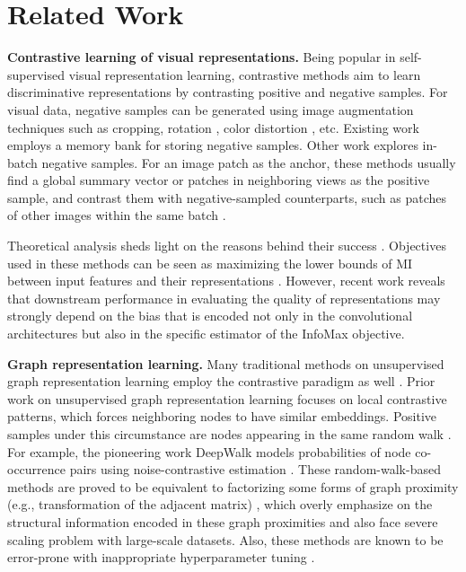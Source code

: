\documentclass{article}
\theoremstyle{remark}
\begin{document}
 \section{Related Work}

\textbf{Contrastive learning of visual representations.\quad}
Being popular in self-supervised visual representation learning, contrastive methods aim to learn discriminative representations by contrasting positive and negative samples. For visual data, negative samples can be generated using image augmentation techniques such as cropping, rotation \cite{Gidaris:2018wr}, color distortion \cite{Larsson:2017vt}, etc.
Existing work \cite{Wu:2018kw,Tian:2019vw,He:2020tu} employs a memory bank for storing negative samples. Other work \cite{Bachman:2019wp,Ye:2019we,Chen:2020wj} explores in-batch negative samples. For an image patch as the anchor, these methods usually find a global summary vector \cite{Hjelm:2019uk,Bachman:2019wp} or patches in neighboring views \cite{vandenOord:2018ut,Henaff:2019ta} as the positive sample, and contrast them with negative-sampled counterparts, such as patches of other images within the same batch \cite{Hjelm:2019uk}.

Theoretical analysis sheds light on the reasons behind their success \cite{Poole:2019vk}. Objectives used in these methods can be seen as maximizing the lower bounds of MI between input features and their representations \cite{Linsker:1988ho}. However, recent work \cite{Tschannen:2020uo} reveals that downstream performance in evaluating the quality of representations may strongly depend on the bias that is encoded not only in the convolutional architectures but also in the specific estimator of the InfoMax objective.

\textbf{Graph representation learning.\quad}
Many traditional methods on unsupervised graph representation learning employ the contrastive paradigm as well \cite{Perozzi:2014ib,Grover:2016ex,Kipf:2016ul,Hamilton:2017wa}.
Prior work on unsupervised graph representation learning focuses on local contrastive patterns, which forces neighboring nodes to have similar embeddings. Positive samples under this circumstance are nodes appearing in the same random walk \cite{Perozzi:2014ib,Grover:2016ex}.
For example, the pioneering work DeepWalk \cite{Perozzi:2014ib} models probabilities of node co-occurrence pairs using noise-contrastive estimation \cite{Gutmann:2012eq}. These random-walk-based methods are proved to be equivalent to factorizing some forms of graph proximity (e.g., transformation of the adjacent matrix) \cite{Qiu:2018ez}, which overly emphasize on the structural information encoded in these graph proximities and also face severe scaling problem with large-scale datasets.
Also, these methods are known to be error-prone with inappropriate hyperparameter tuning \cite{Perozzi:2014ib,Grover:2016ex}.
\end{document}
